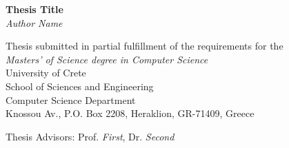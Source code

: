 \begin{titlepage}
\begin{center}

\LARGE \textbf{Thesis Title}\\[0.5cm]
\LARGE \textit{Author Name}\\[0.5cm]

\vfill

\normalsize{
Thesis submitted in partial fulfillment of the requirements for the\\[0.30cm]

\textit{Masters' of Science degree in Computer Science}}\\[0.30cm]

University of Crete\\
School of Sciences and Engineering\\
Computer Science Department\\
Knossou Av., P.O. Box 2208, Heraklion, GR-71409, Greece\\[0.5cm]

\vfill

\Large{Thesis Advisors: Prof. \emph{First}, Dr. \emph{Second}}\\[0.5cm]

\vfill

\end{center}

\worksupportedby{}
\end{titlepage}
